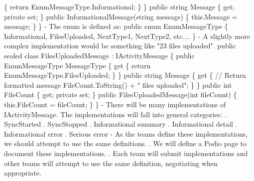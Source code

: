\begin{DoxyCode}
                  \{
                      \textcolor{keywordflow}{return} EnumMessageType.Informational;
                  \}
              \}
              \textcolor{keyword}{public} \textcolor{keywordtype}{string} Message \{ \textcolor{keyword}{get}; \textcolor{keyword}{private} \textcolor{keyword}{set}; \}
              \textcolor{keyword}{public} InformationalMessage(\textcolor{keywordtype}{string} message)
              \{
                  this.Message = message;
              \}
          \}
    - The \textcolor{keyword}{enum} is defined as:
          \textcolor{keyword}{public} \textcolor{keyword}{enum} EnumMessageType
          \{
              Informational,
              FilesUploaded,
              NextType1,
              NextType2,
              etc....
          \}
    - A slightly more complex implementation would be something like \textcolor{stringliteral}{"23 files
       uploaded"}.
          \textcolor{keyword}{public} sealed \textcolor{keyword}{class }FilesUploadedMessage : IActivityMessage
          \{
              \textcolor{keyword}{public} EnumMessageType MessageType 
              \{
                  \textcolor{keyword}{get}
                  \{
                      \textcolor{keywordflow}{return} EnumMessageType.FilesUploaded;
                  \}
              \}
              \textcolor{keyword}{public} \textcolor{keywordtype}{string} Message
              \{
                  \textcolor{keyword}{get}
                  \{
                      \textcolor{comment}{// Return formatted message}
                      FileCount.ToString() + \textcolor{stringliteral}{" files uploaded"};
                  \}
              \}
              \textcolor{keyword}{public} \textcolor{keywordtype}{int} FileCount \{ \textcolor{keyword}{get}; \textcolor{keyword}{private} \textcolor{keyword}{set}; \}
              \textcolor{keyword}{public} FilesUploadedMessage(\textcolor{keywordtype}{int} fileCount)
              \{
                  this.FileCount = fileCount;
              \}
          \}
    - There will be many implementations of IActivityMessage.  The 
      implementations will fall into general categories:
      . SyncStarted
      . SyncStopped
      . Informational summary
      . Informational detail
      . Informational error
      . Serious error
    - As the teams define these implementations, we should attempt to use the 
      same definitions.
      . We will define a Podio page to document these implementations.
      . Each team will submit implementations and other teams will attempt to 
      use the same definition, negotiating when appropriate.

\end{DoxyCode}
